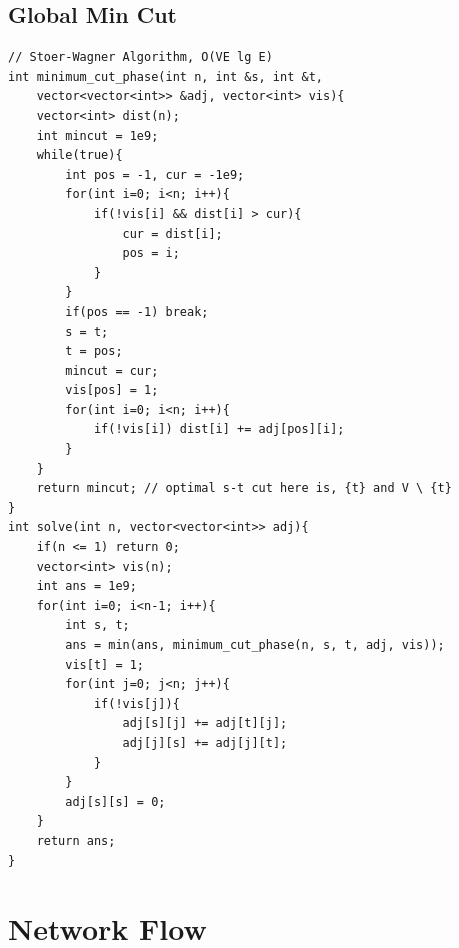 \documentclass[landscape, 8pt, a4paper, oneside, twocolumn]{extarticle}
\begin{document}
\subsection{Global Min Cut}
\begin{verbatim}
// Stoer-Wagner Algorithm, O(VE lg E)
int minimum_cut_phase(int n, int &s, int &t,
    vector<vector<int>> &adj, vector<int> vis){
    vector<int> dist(n);
    int mincut = 1e9;
    while(true){
        int pos = -1, cur = -1e9;
        for(int i=0; i<n; i++){
            if(!vis[i] && dist[i] > cur){
                cur = dist[i];
                pos = i;
            }
        }
        if(pos == -1) break;
        s = t;
        t = pos;
        mincut = cur;
        vis[pos] = 1;
        for(int i=0; i<n; i++){
            if(!vis[i]) dist[i] += adj[pos][i];
        }
    }
    return mincut; // optimal s-t cut here is, {t} and V \ {t}
}
int solve(int n, vector<vector<int>> adj){
    if(n <= 1) return 0;
    vector<int> vis(n);
    int ans = 1e9;
    for(int i=0; i<n-1; i++){
        int s, t;
        ans = min(ans, minimum_cut_phase(n, s, t, adj, vis));
        vis[t] = 1;
        for(int j=0; j<n; j++){
            if(!vis[j]){
                adj[s][j] += adj[t][j];
                adj[j][s] += adj[j][t];
            }
        }
        adj[s][s] = 0;
    }
    return ans;
}
\end{verbatim}
\clearpage
\section{Network Flow}
\end{document}
